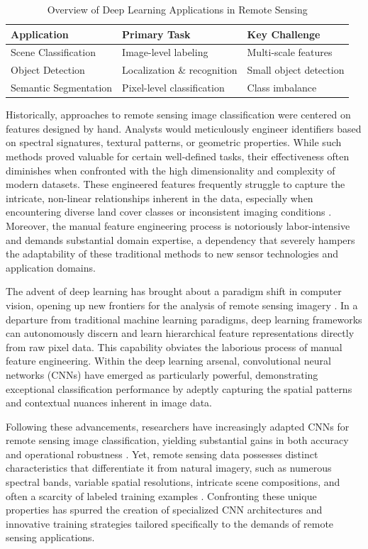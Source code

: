 \documentclass[12pt,a4paper]{article}
\begin{document}
\begin{table}[htbp]
\centering
\caption{Overview of Deep Learning Applications in Remote Sensing}
\label{tab:applications}
\begin{tabular}{@{}lll@{}}
\toprule
\textbf{Application} & \textbf{Primary Task} & \textbf{Key Challenge} \\ 
\midrule
Scene Classification & Image-level labeling & Multi-scale features \\
Object Detection & Localization \& recognition & Small object detection \\
Semantic Segmentation & Pixel-level classification & Class imbalance \\
\bottomrule
\end{tabular}
\end{table}

Historically, approaches to remote sensing image classification were centered on features designed by hand. Analysts would meticulously engineer identifiers based on spectral signatures, textural patterns, or geometric properties. While such methods proved valuable for certain well-defined tasks, their effectiveness often diminishes when confronted with the high dimensionality and complexity of modern datasets. These engineered features frequently struggle to capture the intricate, non-linear relationships inherent in the data, especially when encountering diverse land cover classes or inconsistent imaging conditions \cite{cheng2016survey}. Moreover, the manual feature engineering process is notoriously labor-intensive and demands substantial domain expertise, a dependency that severely hampers the adaptability of these traditional methods to new sensor technologies and application domains.

The advent of deep learning has brought about a paradigm shift in computer vision, opening up new frontiers for the analysis of remote sensing imagery \cite{zhu2017deep}. In a departure from traditional machine learning paradigms, deep learning frameworks can autonomously discern and learn hierarchical feature representations directly from raw pixel data. This capability obviates the laborious process of manual feature engineering. Within the deep learning arsenal, convolutional neural networks (CNNs) have emerged as particularly powerful, demonstrating exceptional classification performance by adeptly capturing the spatial patterns and contextual nuances inherent in image data.

Following these advancements, researchers have increasingly adapted CNNs for remote sensing image classification, yielding substantial gains in both accuracy and operational robustness \cite{liu2019learning}. Yet, remote sensing data possesses distinct characteristics that differentiate it from natural imagery, such as numerous spectral bands, variable spatial resolutions, intricate scene compositions, and often a scarcity of labeled training examples \cite{cheng2016survey}. Confronting these unique properties has spurred the creation of specialized CNN architectures and innovative training strategies tailored specifically to the demands of remote sensing applications.
\end{document}
